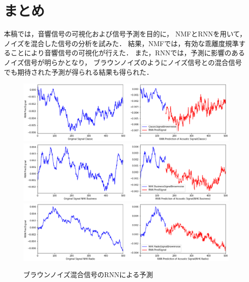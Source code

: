\documentclass{deimj}
\begin{document}
\vspace{-6pt}
\section{まとめ}
\vspace{-6pt}
本稿では，音響信号の可視化および信号予測を目的に，
NMFとRNNを用いて，ノイズを混合した信号の分析を試みた．
結果，NMFでは，有効な乖離度規準することにより音響信号の可視化が行えた．
%
また，RNNでは，予測に影響のあるノイズ信号が明らかとなり，
ブラウンノイズのようにノイズ信号との混合信号でも期待された予測が得られる結果も得られた．

\newpage
\begin{figure}
\vspace{-6pt}
\includegraphics[width=0.85\columnwidth]{./eps/RNN_Brownnoise/RNN_Brownnoise_Classic.eps}\\
\label{fig:Noise}
\includegraphics[width=0.85\columnwidth]{./eps/RNN_Brownnoise/RNN_Brownnoise_NHKBusiness.eps}\\
\label{fig:Noise}
\includegraphics[width=0.85\columnwidth]{./eps/RNN_Brownnoise/RNN_Brownnoise_NHKRadio.eps}
\vspace{-3pt}
\caption{ブラウンノイズ混合信号のRNNによる予測}
\vspace{-6pt}
\label{fig:NoiseBrownnoise}
\vspace{-6pt}
\end{figure}
%
\vspace{-10pt}
\end{document}
